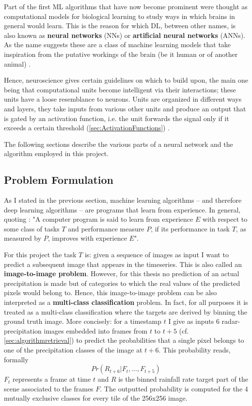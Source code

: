Part of the first ML algorithms that have now become prominent were thought as computational models for biological learning to study ways in which brains in general would learn. This is the reason for which DL, between other names, is also known as \textbf{neural networks} (NNs) or \textbf{artificial neural networks} (ANNs). As the name suggests these are a class of machine learning models that take inspiration from the putative workings of the brain (be it human or of another animal) \citep{Goodfellow2016}. 

Hence, neuroscience gives certain guidelines on which to build upon, the main one being that computational units become intelligent via their interactions; these units have a loose resemblance to neurons. Units are organized in different ways and layers, they take inputs from various other units and produce an output that is gated by an activation function, i.e. the unit forwards the signal only if it exceeds a certain threshold (\cref{sec:ActivationFunctions}) \citep{Goodfellow2016}.

The following sections describe the various parts of a neural network and the algorithm employed in this project.

\subsection{Problem Formulation} \label{sec:problemformulation}
As I stated in the previous section, machine learning algorithms -- and therefore deep learning algorithms -- are programs that learn from experience. In general, quoting \citet{Mitchell1997MachineLearning}: "A computer program is said to learn from experience $E$ with respect to some class of tasks $T$ and performance measure $P$, if its performance in task $T$, as measured by $P$, improves with experience $E$". 

For this project the task $T$ is: given a sequence of images as input I want to predict a subsequent image that appears in the timeseries. This is also called an \textbf{image-to-image problem}. However, for this thesis no prediction of an actual precipitation is made but of categories to which the real values of the predicted pixels would belong to. Hence, this image-to-image problem can be also interpreted as a \textbf{multi-class classification} problem. In fact, for all purposes it is treated as a multi-class classification where the targets are derived by binning the ground truth image. More concisely: for a timestamp $t$ I give as inputs 6 radar-precipitation images embedded into frames from $t$ to $t+5$ (cf. \cref{sec:algorithmretrieval}) to predict the probabilities that a single pixel belongs to one of the precipitation classes of the image at $t+6$. This probability reads, formally
\begin{equation}
    Pr(R_{t+6}|F_t,...,F_{t+5})
\end{equation}
$F_t$ represents a frame at time $t$ and $R$ is the binned rainfall rate target part of the scene associated to the frames $F$. The outputted probability is computed for the 4 mutually exclusive classes for every tile of the 256x256 image.

